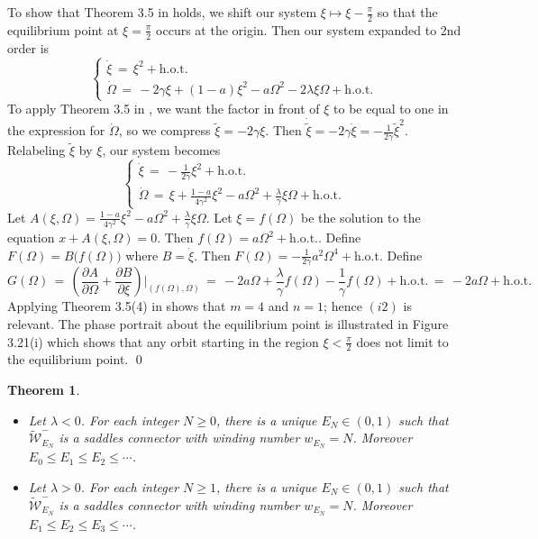\documentclass[11 pt]{article}
\newtheorem{thm}{Theorem}[section]
\renewcommand\l{\lambda}
\renewcommand\({\left(}
\renewcommand\){\right)}
\newcommand\wt{\widetilde}
\newcommand\<{\langle}
\renewcommand\>{\rangle}
\renewcommand\l{\lambda}
\newcommand\g{\gamma}
\newcommand\8{\infty}
\newcommand{\pd}{\partial}
\newcommand{\mc}{\mathcal}
\begin{document}
To show that Theorem 3.5 in \cite{QTPDS} holds, we shift our system $\xi \mapsto \xi - \frac{\pi}{2}$ so that the equilibrium point at $\xi = \frac{\pi}{2}$ occurs at the origin. Then our system expanded to 2nd order is
\[ 
\left\{
 \begin{array}{ll}
      \dot{\xi} \,=\, \xi^2 + \text{h.o.t.}  \\
      \dot{\Omega} \,=\,  -2\gamma \xi + (1-a)\xi^2 -a\Omega^2 -2\lambda\xi\Omega  +\text{h.o.t.}
\end{array} 
\right.
\]
To apply Theorem 3.5 in \cite{QTPDS}, we want the factor in front of $\xi$ to be equal to one in the expression for $\dot{\Omega}$, so we compress $\wt{\xi} = -2\gamma \xi$. Then $\dot{\wt{\xi}} = -2\gamma \dot{\xi} = -\frac{1}{2\gamma}\wt{\xi}^2$. Relabeling $\wt{\xi}$ by $\xi$, our system becomes
\[ 
\left\{
 \begin{array}{ll}
      \dot{\xi} \,=\, -\frac{1}{2\gamma}\xi^2 + \text{h.o.t.}  \\
      \dot{\Omega} \,=\,  \xi + \frac{1-a}{4\gamma^2}\xi^2 -a\Omega^2 + \frac{\lambda}{\gamma}\xi\Omega  +\text{h.o.t.}
\end{array} 
\right.
\]
Let $A(\xi, \Omega) = \frac{1-a}{4\gamma^2}\xi^2 -a\Omega^2 + \frac{\lambda}{\gamma}\xi\Omega$. Let $\xi = f(\Omega)$ be the solution to the equation $x + A(\xi, \Omega) = 0$. Then $f(\Omega) = a\Omega^2 + \text{h.o.t.}$. Define $F(\Omega) = B\big(f(\Omega)\big)$ where $B = \dot{\xi}$. Then $F(\Omega) = -\frac{1}{2\gamma}a^2\Omega^4 + \text{h.o.t.}$ Define 
\[G(\Omega) \,=\, \left(\frac{\pd A}{\pd \Omega} + \frac{\pd B}{\pd \xi}\right)\bigg|_{(f(\Omega),\Omega )} \,=\, -2a\Omega + \frac{\l}{\g}f(\Omega) - \frac{1}{\gamma}f(\Omega)+\text{h.o.t.} \,=\, -2a\Omega + \text{h.o.t.}
\]
Applying Theorem 3.5(4) in \cite{QTPDS} shows that $m = 4$ and $n = 1$; hence $(i2)$ is relevant. The phase portrait about the equilibrium point is illustrated in Figure 3.21(i) which shows that any orbit starting in the region $\xi < \frac{\pi}{2}$ does not limit to the equilibrium point. 
\qed


\medskip
\medskip


\begin{thm}\label{exist omega system saddle connectors thm}\: $\phantom{nix}$ 
\begin{itemize}
\item[$\bullet$] Let $\l < 0$. For each integer $N \geq 0$, there is a unique $E_N \in (0,1)$ such that $\wt{\mc{W}}^-_{E_N}$ is a saddles connector with winding number $w_{E_N} = N$. Moreover $E_0 \leq E_1 \leq E_2 \leq \dotsb$.
\item[$\bullet$] Let $\l > 0$. For each integer $N \geq 1$, there is a unique $E_N \in (0,1)$ such that $\wt{\mc{W}}^-_{E_N}$ is a saddles connector with winding number $w_{E_N} = N$. Moreover $E_1 \leq E_2 \leq E_3 \leq \dotsb$.
\end{itemize} 
\end{thm}
\end{document}

